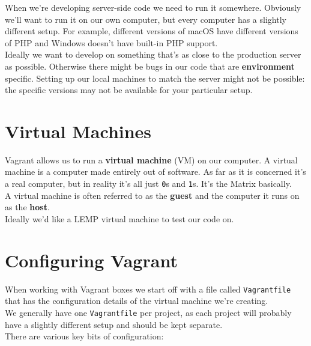 When we're developing server-side code we need to run it somewhere. Obviously we'll want to run it on our own computer, but every computer has a slightly different setup. For example, different versions of macOS have different versions of PHP and Windows doesn't have built-in PHP support.
\\

Ideally we want to develop on something that's as close to the production server as possible. Otherwise there might be bugs in our code that are \textbf{environment} specific. Setting up our local machines to match the server might not be possible: the specific versions may not be available for your particular setup.

\section{Virtual Machines}

Vagrant allows us to run a \textbf{virtual machine} (VM) on our computer. A virtual machine is a computer made entirely out of software. As far as it is concerned it's a real computer, but in reality it's all just \texttt{0}s and \texttt{1}s. It's the Matrix basically.
\\

A virtual machine is often referred to as the \textbf{guest} and the computer it runs on as the \textbf{host}.
\\

Ideally we'd like a LEMP virtual machine to test our code on.


\section{Configuring Vagrant}

When working with Vagrant boxes we start off with a file called \texttt{Vagrantfile} that has the configuration details of the virtual machine we're creating.
\\

We generally have one \texttt{Vagrantfile} per project, as each project will probably have a slightly different setup and should be kept separate.
\\

There are various key bits of configuration:


